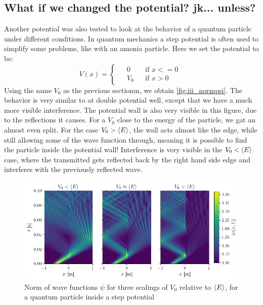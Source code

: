\subsection{What if we changed the potential? jk... unless?}

Another potential was also tested to look at the behavior of a quantum particle under different conditions. In quantum mechanics a step potential is often used to simplify some problems, like with an amonia particle. Here we set the potential to be:
\begin{equation}
    V(x) = \begin{cases}
        \begin{aligned}
            &0 &&\textrm{if } x <= 0 \\
            &V_0 &&\textrm{if } x > 0
        \end{aligned}
    \end{cases}
\end{equation}
Using the same \(V_0\) as the previous sectionm, we obtain \autoref{fig:iii_normpsi}. The behavior is very similar to at double potential well, except that we have a much more visible interference. The potential wall is also very visible in this figure, due to the reflections it causes. For a \(V_0\) close to the energy of the particle, we gat an almost even split. For the case \(V_0 > \langle E \rangle\), the wall acts almost like the edge, while still allowing some of the wave function through, meaning it is possible to find the particle inside the potential wall! Interference is very visible in the \(V_0 < \langle E \rangle\) case, where the transmitted gets reflected back by the right hand side edge and interferes with the previously reflected wave.

\begin{figure}[h]
    \centering
    \includegraphics[width=\linewidth]{figures/iii_normpsi.png}
    \caption{Norm of wave functions $\psi$ for three scalings of $V_0$ relative to $\langle E \rangle$, for a quantum particle inside a step potential}
    \label{fig:iii_normpsi}
\end{figure}

